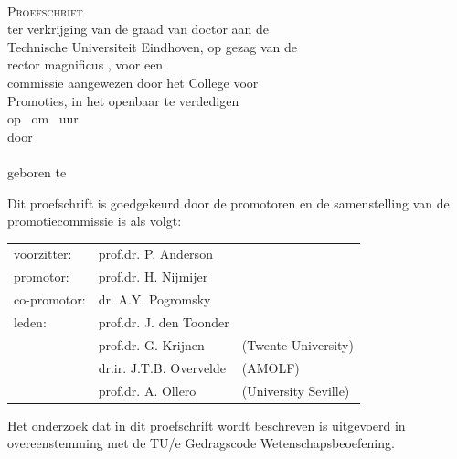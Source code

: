 \newpage
\thispagestyle{empty}



\vspace*{30mm}
\begin{center}
{\LARGE\sf\maintitle}\\[30mm] %
{\large\textsc{Proefschrift}}\\[8mm]
ter verkrijging van de graad van doctor aan de\\
Technische Universiteit Eindhoven, op gezag van de\\
rector magnificus \rector, voor een\\
commissie aangewezen door het College voor\\
Promoties, in het openbaar te verdedigen\\
op \ om \ uur\\[8mm]
door\\[8mm]
\@author\\[8mm]
geboren te \placeofbirth
\end{center}
\vfill

\newpage
\thispagestyle{empty}

\noindent
Dit proefschrift is goedgekeurd door de promotoren en de samenstelling van de promotiecommissie is als volgt:\\[7mm]

\noindent
\begin{tabular}{@{}l p{3.8cm} p{3.8cm}}
voorzitter:                 &   prof.dr. P. Anderson \\
promotor:                   &   prof.dr. H. Nijmijer \\
co-promotor:                &   dr. A.Y. Pogromsky \\
leden:                      &   prof.dr. J. den Toonder \\
                            &   prof.dr. G. Krijnen & (Twente University) \\
                            &   dr.ir. J.T.B. Overvelde &  (AMOLF) \\
                            &   prof.dr. A. Ollero  &  (University Seville) \\
\end{tabular}

\vfill
\noindent
Het onderzoek dat in dit proefschrift wordt beschreven is uitgevoerd in overeenstemming met de TU/e Gedragscode Wetenschapsbeoefening.
